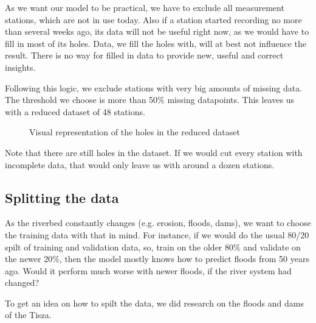 \documentclass{article}
\begin{document}
As we want our model to be practical, we have to exclude all measurement
stations, which are not in use today. 
Also if a station started recording no more than several weeks ago, its
data will not be useful right now, as we would have to fill in most of its
holes. Data, we fill the holes with, will at best not influence the result.
There is no way for filled in data to provide new, useful and correct
insights.

Following this logic, we exclude stations with very big amounts of missing
data. The threshold we choose is more than 50\% missing datapoints. This
leaves us with a reduced dataset of 48 stations.

\begin{figure}[h]
  \caption{Visual representation of the holes in the reduced dataset}
\end{figure}

Note that there are still holes in the dataset. If we would cut every station
with incomplete data, that would only leave us with around a dozen stations.

\subsection{Splitting the data}

As the riverbed constantly changes (e.g. erosion, floods, dams), we
want to choose the training data with that in mind. For instance, if we would
do the usual 80/20 spilt of training and validation data, so, train on the
older 80\% and validate on the newer 20\%, then the model mostly knows how to
predict floods from 50 years ago. Would it perform much worse with newer
floods, if the river system had changed?

To get an idea on how to spilt the data, we did research on the floods and
dams of the Tisza.
\end{document}
